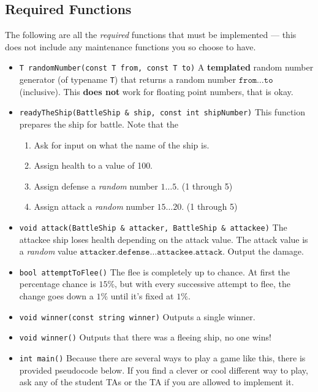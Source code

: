 \documentclass[12pt]{article}
\begin{document}
\subsection*{Required Functions}
The following are all the \textit{required} functions that must be implemented --- this does not include any maintenance functions you so choose to have.

\begin{itemize}
    \item \texttt{T randomNumber(const T from, const T to)} A \textbf{templated} random number generator (of typename \texttt{T}) that returns a random number $\texttt{from} \ldots \texttt{to}$ (inclusive). This \textbf{does not} work for floating point numbers, that is okay.

    \item \texttt{readyTheShip(BattleShip \& ship, const int shipNumber)} This function prepares the ship for battle. Note that the
    \begin{enumerate}
        \item Ask for input on what the name of the ship is.
        \item Assign health to a value of \num{100}.
        \item Assign defense a \textit{random} number $1 \ldots 5$. (\num{1} through \num{5})
        \item Assign attack a \textit{random} number $15 \ldots 20$. (\num{1} through \num{5})
    \end{enumerate}

    \item \texttt{void attack(BattleShip \& attacker, BattleShip \& attackee)} The attackee ship loses health depending on the attack value. The attack value is a \textit{random} value $\texttt{attacker.defense} \ldots \texttt{attackee.attack}$. Output the damage.

    \item \texttt{bool attemptToFlee()} The flee is completely up to chance. At first the percentage chance is $15\%$, but with every successive attempt to flee, the change goes down a $1\%$ until it's fixed at $1\%$.

    \item \texttt{void winner(const string winner)} Outputs a single winner.

    \item \texttt{void winner()} Outputs that there was a fleeing ship, no one wins!

    \item \texttt{int main()} Because there are several ways to play a game like this, there is provided pseudocode below. If you find a clever or cool different way to play, ask any of the student TAs or the TA if you are allowed to implement it.

\end{itemize}
\end{document}
